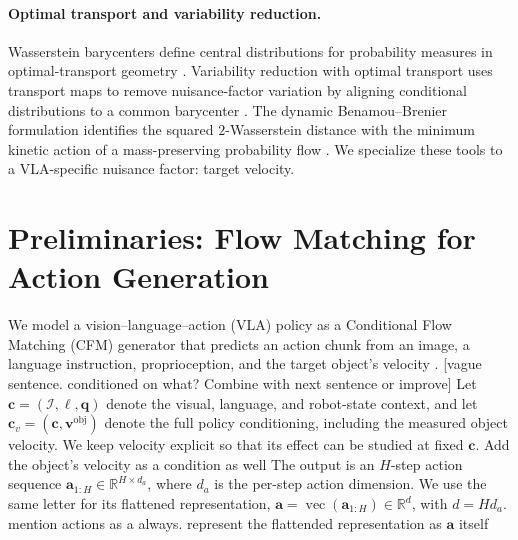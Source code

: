 \documentclass[10pt,twocolumn,letterpaper]{article}
\newcommand{\EditAP}[1]{{\color{blue} #1}}
\begin{document}
\paragraph{Optimal transport and variability reduction.}
Wasserstein barycenters define central distributions for probability measures in optimal-transport geometry \citep{agueh2011barycenters,villani2009optimal,peyre2019computational}. Variability reduction with optimal transport uses transport maps to remove nuisance-factor variation by aligning conditional distributions to a common barycenter \citep{hung2022variability}. The dynamic Benamou--Brenier formulation identifies the squared $2$-Wasserstein distance with the minimum kinetic action of a mass-preserving probability flow \citep{benamou2000computational,ambrosio2008gradient}. We specialize these tools to a VLA-specific nuisance factor: target velocity.


\section{Preliminaries: Flow Matching for Action Generation}
\label{sec:prelim}

We model a vision--language--action (VLA) policy as a Conditional Flow
Matching (CFM) generator that predicts an action chunk from an image,
a language instruction, proprioception, and the target object's velocity
\citep{black2025pi0}. \EditAP{[vague sentence. conditioned on what? Combine with next sentence or improve]}
Let $\mathbf c=(\mathcal I,\ell,\mathbf q)$ denote the visual, language,
and robot-state context, and let
$\mathbf c_v=(\mathbf c,\mathbf v^{\mathrm{obj}})$ denote the full policy
conditioning, including the measured object velocity. We keep velocity
explicit so that its effect can be studied at fixed $\mathbf c$. \EditAP{Add the object's velocity as a condition as well}
The output is an $H$-step action sequence
$\mathbf a_{1:H}\in\mathbb R^{H\times d_a}$, where $d_a$ is the per-step
action dimension. We use the same letter for its flattened representation,
$\mathbf a=\operatorname{vec}(\mathbf a_{1:H})\in\mathbb R^d$, with
$d=H d_a$. \EditAP{mention actions as a always. represent the flattended representation as $\mathbf a $ itself}
\end{document}
